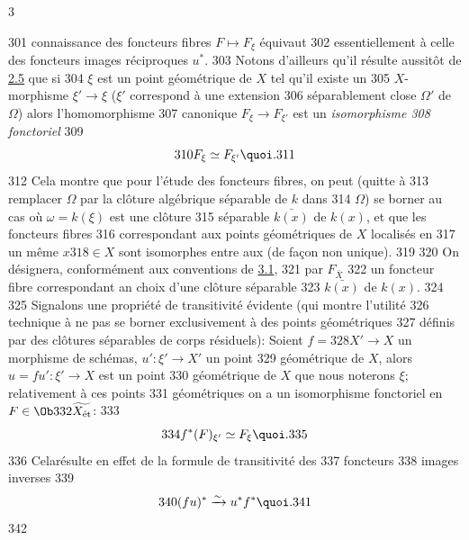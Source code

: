 3	\documentclass[10pt]{../fichiers-configuration-latex/smfart}
\begin{document}
   301	connaissance des foncteurs fibres $F \mapsto F_{\xi}$ équivaut
   302	essentiellement à celle des foncteurs images réciproques $u^{\ast}$.
   303	Notons d'ailleurs qu'il résulte aussitôt de \hyperref[VIII.cor2.5]{2.5} que si
   304	$\xi$ est un point géométrique de $X$ tel qu'il existe un
   305	$X$-morphisme $\xi'\to \xi$ (\ie $\xi'$ correspond à une extension
   306	séparablement close $\Omega'$ de $\Omega$) alors l'homomorphisme
   307	canonique $F_{\xi} \to F_{\xi'}$ est un \emph{isomorphisme
   308	fonctoriel}
   309	$$
   310	F_{\xi} \simeq F_{\xi'}{\quoi}.
   311	$$
   312	Cela montre que pour l'étude des foncteurs fibres, on peut (quitte à
   313	remplacer $\Omega$ par la clôture algébrique séparable de $k$ dans
   314	$\Omega$) se borner au cas où $\omega = k(\xi)$ est une clôture
   315	séparable $\bar{k(x)}$ de $k(x)$, et que les foncteurs fibres
   316	correspondant aux points géométriques de $X$ localisés en
   317	un même $x
   318	\in X$ sont isomorphes entre aux (de façon non unique).
   319	
   320	On désignera, conformément aux conventions de \hyperref[VIII.subsec3.1]{3.1},
   321	par $F_{\bar{X}}$
   322	un foncteur fibre correspondant an choix d'une clôture séparable
   323	$\bar{k(x)}$ de $k(x)$.
   324	
   325	Signalons une propriété de transitivité évidente (qui montre l'utilité
   326	technique à ne pas se borner exclusivement à des points géométriques
   327	définis par des clôtures séparables de corps résiduels): Soient $f =
   328	X'\to X$ un morphisme de schémas, $u' : \xi'\to X'$ un point
   329	géométrique de $X$, alors $u = f u': \xi'\to X$ est un point
   330	géométrique de $X$ que nous noterons $\xi$; relativement à ces points
   331	géométriques on a un isomorphisme fonctoriel en $F \in \Ob
   332	\widetilde{X_{\text{ét}}}$:
   333	$$
   334	f^{\ast} (F)_{\xi'} \simeq F_{\xi}{\quoi}.
   335	$$
   336	Cela\pageoriginale  résulte en effet de la formule de transitivité des
   337	foncteurs
   338	images inverses
   339	$$
   340	(fu)^{\ast} \xrightarrow{\sim} u^{\ast} f^{\ast}{\quoi}.
   341	$$
   342	
\end{document}
